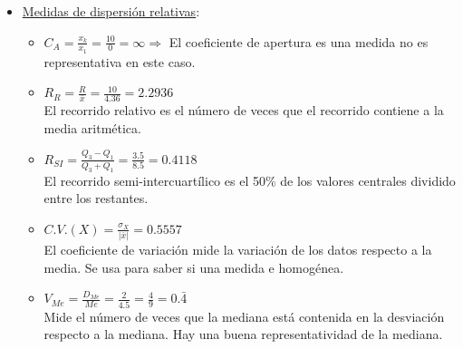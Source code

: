 \begin{ejercicio}
\begin{enumerate}
\begin{itemize}
            \item \underline{Medidas de dispersión relativas}:
            \begin{itemize}
                \item $C_A = \frac{x_k}{x_1} = \frac{10}{0} = \infty \Longrightarrow$ El coeficiente de apertura es una medida no es representativa en este caso.
                \item $R_R = \frac{R}{\bar{x}} = \frac{10}{4.36} = 2.2936$\\
                El recorrido relativo es el número de veces que el recorrido contiene a la media aritmética.
                \item $R_{SI} = \frac{Q_3 - Q_1}{Q_3 + Q_1} = \frac{3.5}{8.5} = 0.4118$\\
                El recorrido semi-intercuartílico es el 50\% de los valores centrales dividido entre los restantes.
                \item $C.V.(X) = \frac{\sigma_X}{|\bar{x}|} = 0.5557$\\
                El coeficiente de variación mide la variación de los datos respecto a la media. Se usa para saber si una medida e homogénea.
                \item $V_{Me} = \frac{D_{Me}}{Me} = \frac{2}{4.5} = \frac{4}{9} = 0.\bar{4}$\\
                Mide el número de veces que la mediana está contenida en la desviación  respecto a la mediana. Hay una buena representatividad de la mediana. 
            \end{itemize}
        \end{itemize}
    \end{enumerate}
\end{ejercicio}

